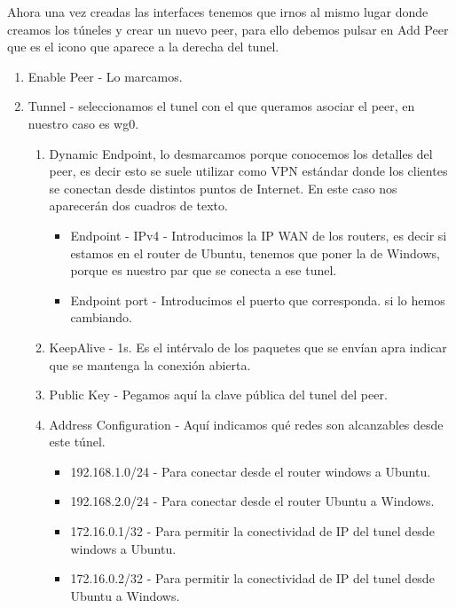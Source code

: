 Ahora una vez creadas las interfaces tenemos que irnos al mismo lugar donde creamos los túneles y crear un nuevo peer, para ello debemos pulsar en Add Peer que es el icono que aparece a la derecha del tunel.

\begin{enumerate}
    \item Enable Peer - Lo marcamos.
    \item Tunnel - seleccionamos el tunel con el que queramos asociar el peer, en nuestro caso es wg0.
    \begin{enumerate}
        \item Dynamic Endpoint, lo desmarcamos porque conocemos los detalles del peer, es decir esto se suele utilizar como VPN estándar donde los clientes se conectan desde distintos puntos de Internet. En este caso nos aparecerán dos cuadros de texto.
            \begin{itemize}
                \item Endpoint - IPv4 - Introducimos la IP WAN de los routers, es decir si estamos en el router de Ubuntu, tenemos que poner la de Windows, porque es nuestro par que se conecta a ese tunel.
                \item Endpoint port - Introducimos el puerto que corresponda. si lo hemos cambiando.
            \end{itemize}
        \item KeepAlive - 1s. Es el intérvalo de los paquetes que se envían apra indicar que se mantenga la conexión abierta.
        \item Public Key - Pegamos aquí la clave pública del tunel del peer.
        \item Address Configuration - Aquí indicamos qué redes son alcanzables desde este túnel.
            \begin{itemize}
                \item 192.168.1.0/24 - Para conectar desde el router windows a Ubuntu.
                \item 192.168.2.0/24 - Para conectar desde el router Ubuntu a Windows.
                \item 172.16.0.1/32 - Para permitir la conectividad de IP del tunel desde windows a Ubuntu.
                \item 172.16.0.2/32 - Para permitir la conectividad de IP del tunel desde Ubuntu a Windows.
            \end{itemize}
    \end{enumerate}
\end{enumerate}

